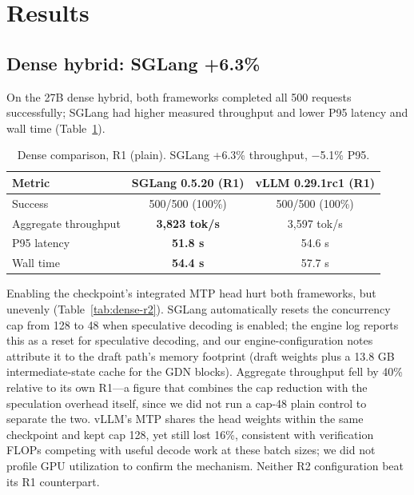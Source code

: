 \documentclass[11pt]{article}
\newcommand{\tps}{tok/s\xspace}
\begin{document}
\section{Results}

\subsection{Dense hybrid: SGLang +6.3\%}
\label{sec:dense}

On the 27B dense hybrid, both frameworks completed all 500 requests successfully; SGLang had higher measured throughput and lower P95 latency and wall time (Table~\ref{tab:dense-r1}).

\begin{table}[t]
\centering
\begin{tabular}{lcc}
\toprule
\textbf{Metric} & \textbf{SGLang 0.5.20 (R1)} & \textbf{vLLM 0.29.1rc1 (R1)} \\
\midrule
Success & 500/500 (100\%) & 500/500 (100\%) \\
Aggregate throughput & \textbf{3,823 \tps} & 3,597 \tps \\
P95 latency & \textbf{51.8 s} & 54.6 s \\
Wall time & \textbf{54.4 s} & 57.7 s \\
\bottomrule
\end{tabular}
\caption{Dense comparison, R1 (plain). SGLang +6.3\% throughput, $-$5.1\% P95.}
\label{tab:dense-r1}
\end{table}

Enabling the checkpoint's integrated MTP head hurt both frameworks, but unevenly (Table~\ref{tab:dense-r2}). SGLang automatically resets the concurrency cap from 128 to 48 when speculative decoding is enabled; the engine log reports this as a reset for speculative decoding, and our engine-configuration notes attribute it to the draft path's memory footprint (draft weights plus a 13.8 GB intermediate-state cache for the GDN blocks). Aggregate throughput fell by 40\% relative to its own R1---a figure that combines the cap reduction with the speculation overhead itself, since we did not run a cap-48 plain control to separate the two. vLLM's MTP shares the head weights within the same checkpoint and kept cap 128, yet still lost 16\%, consistent with verification FLOPs competing with useful decode work at these batch sizes; we did not profile GPU utilization to confirm the mechanism. Neither R2 configuration beat its R1 counterpart.
\end{document}
